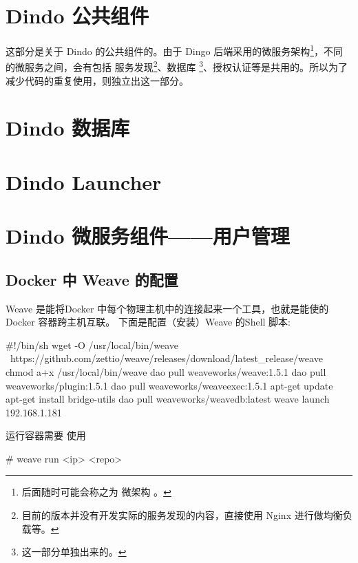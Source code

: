 \documentclass{dingo}
\begin{document}
  \section{Dindo 公共组件}
  这部分是关于 Dindo 的公共组件的。由于 Dingo 后端采用的微服务架构\footnote{后面随时可能会称之为 微架构 。}，不同的微服务之间，会有包括
  服务发现\footnote{目前的版本并没有开发实际的服务发现的内容，直接使用 Nginx 进行做均衡负载等。}、数据库
  \footnote{这一部分单独出来的。}、授权认证等是共用的。所以为了减少代码的重复使用，则独立出这一部分。
  
  \section{Dindo 数据库}
  
  \section{Dindo Launcher}
  
  \section{Dindo 微服务组件——用户管理}
  
  \newpage
  \begin{appendix}
	  	\section{Docker 中 Weave  的配置} %
	  	Weave 是能将Docker 中每个物理主机中的连接起来一个工具，也就是能使的 Docker 容器跨主机互联。
	  	下面是配置（安装）Weave 的Shell 脚本:
	  	\begin{shell}[caption=Weave 安装]
#!/bin/sh
wget -O /usr/local/bin/weave \
https://github.com/zettio/weave/releases/download/latest_release/weave
chmod a+x /usr/local/bin/weave
dao pull weaveworks/weave:1.5.1
dao pull weaveworks/plugin:1.5.1
dao pull weaveworks/weaveexec:1.5.1
apt-get update
apt-get install bridge-utils
dao pull weaveworks/weavedb:latest
weave launch 192.168.1.181
	  	\end{shell}
	  	运行容器需要 使用
	  	\begin{shell}
# weave run <ip> <repo> 
	  	\end{shell}
  \end{appendix} 
  
\end{document}
